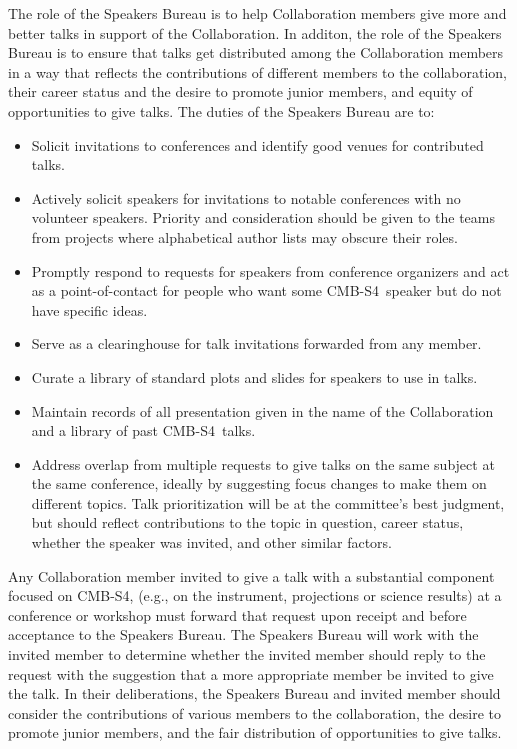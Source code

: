 \documentclass[12pt]{article}
\newcommand\collabname{CMB-S4}
\begin{document}
The role of the Speakers Bureau is to help Collaboration members give more and better talks in support of the Collaboration. In additon, the role of the Speakers Bureau is to ensure that talks get distributed among the Collaboration members in a way that reflects the contributions of different members to the collaboration, their career status and the desire to promote junior members, and equity of opportunities to give talks. The duties of the Speakers Bureau are to:
\begin{itemize}

\item Solicit invitations to conferences and identify good venues for contributed talks.

\item Actively solicit speakers for invitations to notable conferences with no volunteer speakers. Priority and consideration should be given to the teams from projects where alphabetical author lists may obscure their roles. 

\item Promptly respond to requests for speakers from conference organizers and act as a point-of-contact for people who want some \collabname\ speaker but do not have specific ideas.

\item Serve as a clearinghouse for talk invitations forwarded from any member.

\item Curate a library of standard plots and slides for speakers to use in talks.

\item Maintain records of all presentation given in the name of the Collaboration and a library of past \collabname\  talks.

\item Address overlap from multiple requests to give talks on the same subject at the same conference, ideally by suggesting focus changes to make them on different topics. Talk prioritization will be at the committee's best judgment, but should reflect contributions to the topic in question, career status, whether the speaker was invited, and other similar factors.

\end{itemize}

Any Collaboration member invited to give a talk with a substantial component focused on \collabname, (e.g., on the instrument, projections or science results) at a conference or workshop must forward that request upon receipt and before acceptance to the Speakers Bureau.  The Speakers Bureau will work with the invited member to determine whether the invited member should reply to the request with the suggestion that a more appropriate member be invited to give the talk. In their deliberations, the Speakers Bureau and invited member should consider
the contributions of various members to the collaboration, the desire to promote junior members, and the fair distribution of opportunities to give talks.
\end{document}
